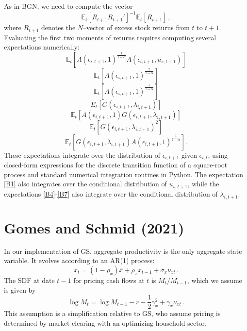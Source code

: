 \documentclass[12pt]{scrarticle}
\begin{document}
\begin{appendices}
As in BGN, we need to compute the vector
$$\mathbb{E}_t[R_{t+1}R_{t+1}']^{-1}\mathbb{E}_t[R_{t+1}]\,,$$
where $R_{t+1}$ denotes the $N$--vector of excess stock returns from $t$ to $t+1$. Evaluating the first two moments of returns requires computing several expectations numerically:
\begin{equation}\label{B1}  
\mathbb{E}_t \left[A(\epsilon_{i, t+1}, 1)^{\frac{1}{1 - \alpha}} A(\epsilon_{i, t+1}, u_{s, t+1})\right]
\end{equation}
\begin{equation} 
\mathbb{E}_{t} \left[A(\epsilon_{i, t+1}, 1)^{\frac{2}{1 - \alpha}}\right]
\end{equation}
\begin{equation}
\mathbb{E}_t\left[ A(\epsilon_{i, t+1}, 1)^{\frac{1}{1 - \alpha}}\right]
\end{equation}
\begin{equation}\label{B4}
E_t \left[G(\epsilon_{i, t+1}, \lambda_{i, t+1})\right]
\end{equation}
\begin{equation}  \label{B5} 
\mathbb{E}_t \left[A(\epsilon_{i, t+1}, 1) G(\epsilon_{i, t+1}, \lambda_{i, t+1})\right]
\end{equation}
\begin{equation} \label{B6} 
\mathbb{E}_t \left[G(\epsilon_{i, t+1}, \lambda_{i, t+1})^2\right]
\end{equation}
\begin{equation}\label{B7} 
\mathbb{E}_t \left[G(\epsilon_{i, t+1}, \lambda_{i, t+1}) A(\epsilon_{i, t+1}, 1)^{\frac{1}{1 - \alpha}}\right].
\end{equation} 
These expectations integrate over the distribution of $\epsilon_{i, t+1}$ given $\epsilon_{i, t}$, using closed-form expressions for the discrete transition function of a square-root process and standard numerical integration routines in Python. The expectation \eqref{B1} also integrates over the conditional distribution of $u_{s, t+1}$, while the expectations \eqref{B4}-\eqref{B7} also integrate over the conditional distribution of $\lambda_{i, t+1}.$

\section{Gomes and Schmid (2021)}

In our implementation of GS, aggregate productivity is the only aggregate state variable. It evolves according to an AR(1) process:
\begin{equation*}
    x_t = (1 - \rho_x) \bar x + \rho_x x_{t-1} + \sigma_x \nu_{xt}\, . 
\end{equation*}
The SDF at date $t-1$ for pricing cash flows at $t$ is $M_t/M_{t-1}$, which we assume is given by
\begin{equation}\label{logsdf}
\log M_{t} = \log M_{t-1} - r - \frac{1}{2}\gamma_x^2 + \gamma_x \nu_{xt}\,.
\end{equation}
This assumption is a simplification relative to GS, who assume pricing is determined by market clearing with an optimizing household sector.


\end{appendices}
\end{document}
